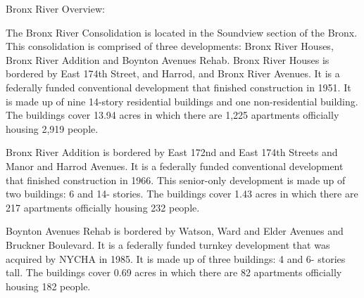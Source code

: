 Bronx River Overview:  

The Bronx River Consolidation is located in the Soundview section of the Bronx. This consolidation is comprised of three developments: Bronx River Houses, Bronx River Addition and Boynton Avenues Rehab. Bronx River Houses is bordered by East 174th Street, and Harrod, and Bronx River Avenues. It is a federally funded conventional development that finished construction in 1951. It is made up of nine 14-story residential buildings and one non-residential building. The buildings cover 13.94 acres in which there are 1,225 apartments officially housing 2,919 people.   

 

Bronx River Addition is bordered by East 172nd and East 174th Streets and Manor and Harrod Avenues. It is a federally funded conventional development that finished construction in 1966. This senior-only development is made up of two buildings: 6 and 14- stories. The buildings cover 1.43 acres in which there are 217 apartments officially housing 232 people.   

Boynton Avenues Rehab is bordered by Watson, Ward and Elder Avenues and Bruckner Boulevard. It is a federally funded turnkey development that was acquired by NYCHA in 1985. It is made up of three buildings: 4 and 6- stories tall. The buildings cover 0.69 acres in which there are 82 apartments officially housing 182 people.   

 